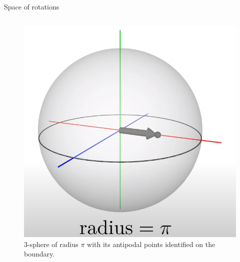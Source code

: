 \documentclass[9pt]{beamer}
\begin{document}
\begin{frame}{Space of rotations}
\begin{columns}[T,onlytextwidth]
            \begin{figure}
                \centering
                \includegraphics[scale=0.1]{Pictures/SO3sphere.png}
                \caption{$3$-sphere of radius $\pi$ with its antipodal points identified on the boundary.}
            \end{figure}
  
    \end{columns}
    
\end{frame}
\end{document}
